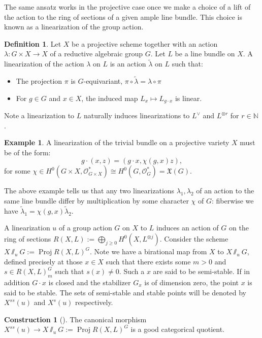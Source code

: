 \documentclass{amsart}
\theoremstyle{definition}
\newtheorem{construction}[theorem]{Construction}
\newtheorem{definition}[theorem]{Definition}
\newtheorem{example}[theorem]{Example}
\DeclareMathOperator{\proj}{Proj}
\begin{document}
The same ansatz works in the projective case once we make a choice of a lift of the action to the ring of sections of a given ample line bundle. This choice is known as a linearization of the group action.
%
%
%
\begin{definition}
 Let \(X\) be a projective scheme together with an action \( \lambda : G \times X \to X\) of a reductive algebraic group \(G\). Let \(L\) be a line bundle on \(X\). A linearization of the action \(\lambda\) on \(L\) is an action \(\tilde{\lambda}\) on \(L\) such that:
\begin{itemize}
\item The projection \(\pi\) is \(G\)-equivariant, \(\pi \circ \tilde{\lambda} = \lambda \circ \pi \)
\item For \(g \in G\) and \(x \in X\), the induced map \(L_x \mapsto L_{g \cdot x}\) is linear.
\end{itemize}
\end{definition}
%
%
%
Note a linearization to \(L\) naturally induces linearizations to \(L^\vee\) and \(L^{\otimes r}\) for \(r \in \mathbb{N}\).
%
%
%
\begin{example}
A linearization of the trivial bundle on a projective variety \(X\) must be of the form:
\[
g \cdot (x,z) = (g \cdot x, \chi(g,x)z),
\]
for some \(\chi \in H^0(G \times X, \mathcal{O}_{G \times X}^*) \cong H^0(G, \mathcal{O}_G^*) = \mathfrak{X}(G).\)
\end{example}
The above example tells us that any two linearizations \(\lambda_1,\lambda_2\) of an action to the same line bundle differ by multiplication by some character \(\chi\) of \(G\): fiberwise we have \(\tilde{\lambda}_1 = \chi(g,x) \tilde{\lambda}_2\).

A linearization \(u\) of a group action \(G\) on \(X\) to \(L\) induces an action of \(G\) on the ring of sections \(R(X,L) := \bigoplus_{j \ge 0} H^0(X,L^{\otimes j}) \). Consider the scheme \(X \sslash_u G := \proj R(X,L)^G\). Note we have a birational map from \(X\) to \(X \sslash_u G\), defined precisely at those \(x \in X\) such that there exists some \(m> 0 \) and \(s \in R(X,L)^G_m\) such that \(s(x) \neq 0\). Such a \(x\) are said to be semi-stable. If in addition \(G \cdot x\) is closed and the stabilizer \(G_x\) is of dimension zero, the point \(x\) is said to be stable. The sets of semi-stable and stable points will be denoted by \(X^{ss}(u)\) and \(X^{s}(u)\) respectively.
%
%
%
\begin{construction}[{\cite[Chapter 1, Section 4]{mumford1994}}]
The canonical morphism \(X^{ss}(u) \to X\sslash_u G := \proj R(X,L)^G \) is a good categorical quotient.
\end{construction}
\end{document}
